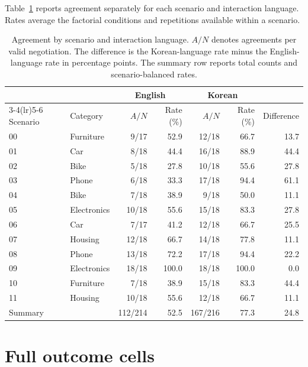 \documentclass{article}
\begin{document}
Table~\ref{tab:scenario-agreement} reports agreement separately for each
scenario and interaction language. Rates average the factorial conditions and
repetitions available within a scenario.

\begin{table}[ht]
\caption{Agreement by scenario and interaction language. $A/N$ denotes
agreements per valid negotiation. The difference is the Korean-language rate
minus the English-language rate in percentage points. The summary row reports
total counts and scenario-balanced rates.}
\label{tab:scenario-agreement}
\centering
\small
\begin{tabular}{llrrrrr}
\toprule
& & \multicolumn{2}{c}{English} & \multicolumn{2}{c}{Korean} & \\
\cmidrule(lr){3-4}\cmidrule(lr){5-6}
Scenario & Category & $A/N$ & Rate (\%) & $A/N$ & Rate (\%) & Difference \\
\midrule
00 & Furniture   & 9/17  & 52.9  & 12/18 & 66.7  & 13.7 \\
01 & Car         & 8/18  & 44.4  & 16/18 & 88.9  & 44.4 \\
02 & Bike        & 5/18  & 27.8  & 10/18 & 55.6  & 27.8 \\
03 & Phone       & 6/18  & 33.3  & 17/18 & 94.4  & 61.1 \\
04 & Bike        & 7/18  & 38.9  & 9/18  & 50.0  & 11.1 \\
05 & Electronics & 10/18 & 55.6  & 15/18 & 83.3  & 27.8 \\
06 & Car         & 7/17  & 41.2  & 12/18 & 66.7  & 25.5 \\
07 & Housing     & 12/18 & 66.7  & 14/18 & 77.8  & 11.1 \\
08 & Phone       & 13/18 & 72.2  & 17/18 & 94.4  & 22.2 \\
09 & Electronics & 18/18 & 100.0 & 18/18 & 100.0 & 0.0 \\
10 & Furniture   & 7/18  & 38.9  & 15/18 & 83.3  & 44.4 \\
11 & Housing     & 10/18 & 55.6  & 12/18 & 66.7  & 11.1 \\
\midrule
Summary & & 112/214 & 52.5 & 167/216 & 77.3 & 24.8 \\
\bottomrule
\end{tabular}
\end{table}


\FloatBarrier

\section{Full outcome cells}
\label{app:cells}
\end{document}
